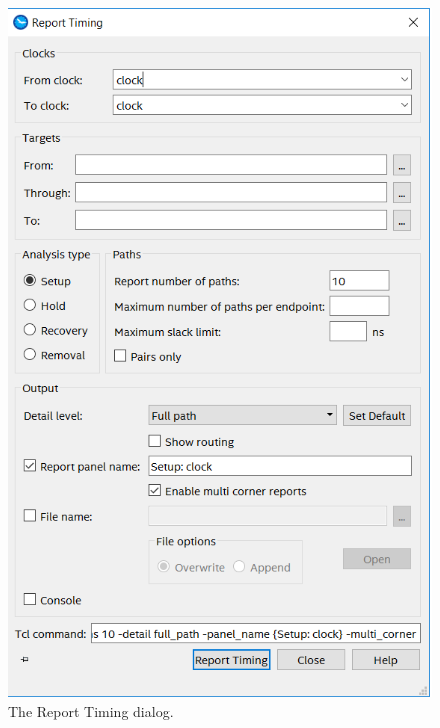 \documentclass[11pt, twoside, pdftex]{article}
\begin{document}
\begin{figure}[H]
\begin{center}
\includegraphics[scale=0.6]{figures/SB2.png}
\end{center}
\caption{The Report Timing dialog.}
\label{fig:SB2}
\end{figure}
\end{document}
